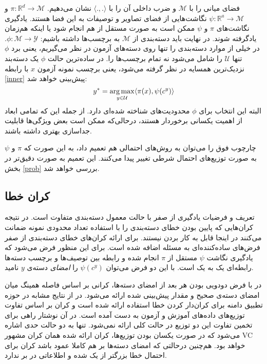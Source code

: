  فضای میانی را با $ \mathcal{M} $ و ضرب داخلی آن را با  $\langle ., . \rangle $ نشان می‌دهیم. 
 $ \pi : \mathbb{R}^d \to \mathcal{M}$ 
 و
 $ \psi : \mathbb{R}^a \to \mathcal{M}$ 
نگاشت‌هایی از فضای تصاویر و توصیفات به این فضا هستند. 
یادگیری نگاشت‌های  $\pi$ و $\psi$ ممکن است به صورت مستقل از هم انجام شود یا اینکه هم‌زمان یادگرفته شوند. در نهایت باید دسته‌بندی از  $ \mathcal{M} $ به برچسب‌ها داشته باشیم:
 $ \phi : \mathcal{M} \to \mathcal{Y}$.
 در خیلی از موارد دسته‌بندی را تنها روی دسته‌های آزمون در نظر می‌گیریم، یعنی برد $\phi$ تنها $ \mathcal{U}$ را شامل می‌شود نه تمام برچسب‌ها را.
در ساده‌ترین حالت $\phi$ یک دسته‌بند نزدیک‌ترین همسایه در نظر گرفته می‌شود، یعنی برچسب نمونه آزمون  $x$ با رابطه \ref{inner} پیش‌بینی خواهد شد:
\begin{equation}\label{inner}
y^* = \operatorname*{arg\,max}_{y \in \mathcal{U}} \langle \pi(x), \psi(c^y) \rangle
\end{equation}
البته این انتخاب برای  $\phi$ محدودیت‌های شناخته شده‌ای دارد. از جمله این که تمامی ابعاد از اهمیت یکسانی برخوردار هستند، درحالی‌که ممکن است بعض ویژگی‌ها قابلیت جداسازی بهتری داشته باشند. 

چارچوب فوق را می‌توان به روش‌های احتمالی هم تعمیم داد، به این صورت که $\pi$ و $\psi$ به صورت توزیع‌های احتمال شرطی تغییر پیدا می‌کنند. این تعمیم به صورت دقیق‌تر در بخش \ref{prob} بررسی خواهد شد. 


\subsection{کران خطا}\label{bound}
تعریف و فرضیات یادگیری از صفر با حالت معمول دسته‌بندی متفاوت است. در نتیجه کران‌هایی که پایین بودن خطای دسته‌بندی را با استفاده تعداد محدودی نمونه ضمانت می‌کنند در اینجا قابل به کار بردن نیستند. برای ارائه کران‌های خطای دسته‌بندی از صفر فرض‌های ساده‌کننده‌ای به مسئله اضافه شده است. برای این منظور فرض می‌شود که یادگیری نگاشت $\psi$ مستقل از $\pi$ انجام شده و رابطه بین توصیف‌ها و برچسب دسته‌ها رابطه‌ای یک به یک است. با این دو فرض می‌توان $\psi(c^y) $ را \emph{ امضای}  دسته‌ی $y$ نامید. 

در \cite{hinton09} با فرض دودویی بودن هر بعد از امضای دسته‌ها، کرانی بر اساس فاصله همینگ 
میان امضای دسته‌ی صحیح و مقدار پیش‌بینی شده ارائه می‌شود. در \cite{emb15} از نتایج مشابه در حوزه تطبیق دامنه برای کران‌دار کردن خطا استفاده ارائه شده است و کران بر اساس تفاوت توزیع‌های داده‌های آموزش و آزمون به دست آمده است. در آن نوشتار راهی برای تخمین تفاوت این دو توزیع در حالت کلی ارائه نمی‌شود. تنها به دو حالت حدی اشاره می‌شود که در صورت یکسان بودن توزیع‌ها، کران ارائه شده همان کران مشهور VC \cite{vapnik} خواهد بود. هم‌چنین درحالتی که امضای دسته‌ها بر هم کاملا عمود باشد کران برای احتمال خطا بزرگتر از یک شده و اطلاعاتی در بر ندارد. 
